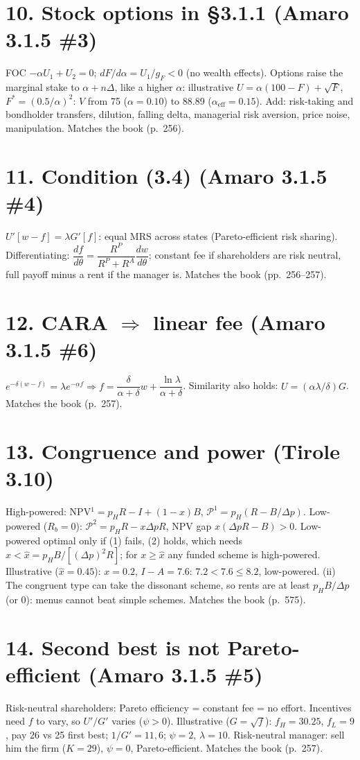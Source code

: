 \documentclass[11pt,a4paper]{article}
\newcommand{\dpp}{\Delta p}
\begin{document}
\section*{10. Stock options in \S3.1.1 (Amaro 3.1.5 \#3)}
FOC $-\alpha U_1+U_2=0$; $dF/d\alpha=U_1/g_F<0$ (no wealth effects). Options raise the marginal stake to
$\alpha+n\Delta$, like a higher $\alpha$: illustrative $U=\alpha(100-F)+\sqrt F$, $F^*=(0.5/\alpha)^2$: $V$ from 75
($\alpha=0.10$) to 88.89 ($\alpha_{\text{eff}}=0.15$). Add: risk-taking and bondholder transfers, dilution,
falling delta, managerial risk aversion, price noise, manipulation. Matches the book (p.~256).

\section*{11. Condition (3.4) (Amaro 3.1.5 \#4)}
$U'[w-f]=\lambda G'[f]$: equal MRS across states (Pareto-efficient risk sharing). Differentiating:
$\dfrac{df}{d\theta}=\dfrac{R^P}{R^P+R^A}\dfrac{dw}{d\theta}$; constant fee if shareholders are risk neutral, full
payoff minus a rent if the manager is. Matches the book (pp.~256--257).

\section*{12. CARA $\Rightarrow$ linear fee (Amaro 3.1.5 \#6)}
$e^{-\delta(w-f)}=\lambda e^{-\alpha f}\Rightarrow f=\dfrac{\delta}{\alpha+\delta}w+\dfrac{\ln\lambda}{\alpha+\delta}$. Similarity also holds:
$U=(\alpha\lambda/\delta)G$. Matches the book (p.~257).

\section*{13. Congruence and power (Tirole 3.10)}
High-powered: NPV$^1=p_HR-I+(1-x)B$, $\mathcal P^1=p_H(R-B/\dpp)$. Low-powered ($R_b=0$):
$\mathcal P^2=p_HR-x\dpp R$, NPV gap $x(\dpp R-B)>0$. Low-powered optimal only if (1) fails, (2) holds,
which needs $x<\hat x=p_HB/[(\dpp)^2R]$; for $x\ge\hat x$ any funded scheme is high-powered. Illustrative
($\hat x=0.45$): $x=0.2$, $I-A=7.6$: $7.2<7.6\le8.2$, low-powered. (ii) The congruent type can take the
dissonant scheme, so rents are at least $p_HB/\dpp$ (or 0): menus cannot beat simple schemes. Matches
the book (p.~575).

\section*{14. Second best is not Pareto-efficient (Amaro 3.1.5 \#5)}
Risk-neutral shareholders: Pareto efficiency = constant fee = no effort. Incentives need $f$ to vary, so
$U'/G'$ varies ($\psi>0$). Illustrative ($G=\sqrt f$): $f_H=30.25$, $f_L=9$, pay 26 vs 25 first best;
$1/G'=11,6$; $\psi=2$, $\lambda=10$. Risk-neutral manager: sell him the firm ($K=29$), $\psi=0$,
Pareto-efficient. Matches the book (p.~257).
\end{document}
